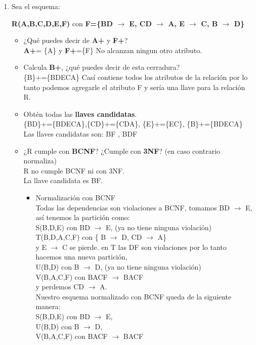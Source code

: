 \documentclass{article}
\begin{document}
\begin{enumerate}
    	\item Sea el esquema:\\
    	\begin{center}
    		\textbf{R(A,B,C,D,E,F)} con \textbf{F=\{BD $\rightarrow$ E, CD $\rightarrow$ A, E $\rightarrow$ C, B $\rightarrow$ D\}}
    	\end{center} 
    	\begin{itemize}
    		\item ¿Qué puedes decir de \textbf{{A}+} y \textbf{{F}+}?\\
    		\textbf{{A}+}= \{A\} y \textbf{{F}+}=\{F\} No alcanzan ningun otro atributo.
    		\item Calcula \textbf{{B}+}, ¿qué puedes decir de esta cerradura?\\
    		\{B\}+=\{BDECA\} Casí contiene todos los atributos de la relación por lo tanto podemos agregarle el atributo F y sería una llave para la relación R.
    		\item  Obtén todas las \textbf{llaves candidatas}.\\
    		\{BD\}+=\{BDECA\},\{CD\}+=\{CDA\}, \{E\}+=\{EC\}, \{B\}+=\{BDECA\}\\
    		Las llaves candidatas son: BF , BDF
    		\item  ¿R cumple con \textbf{BCNF}? ¿Cumple con \textbf{3NF}? (en caso contrario normaliza) \\
    		R no cumple BCNF ni con 3NF.\\
    		La llave candidata es BF.
    		\begin{itemize}
    			\item Normalización con BCNF\\
    			Todas las dependencias son violaciones a BCNF, tomamos BD $\rightarrow$ E, así tenemos la partición como:\\
    			S(B,D,E) con BD $\rightarrow$ E, (ya no tiene ninguna violación)\\
    			T(B,D,A,C,F) con \{ B $\rightarrow$ D, CD $\rightarrow$ A\}\\
    			y E $\rightarrow$ C se pierde.
    			en T las DF son violaciones por lo tanto hacemos una nueva partición,\\
    			U(B,D) con B $\rightarrow$ D, (ya no tiene ninguna violación) \\
    			V(B,A,C,F) con BACF $\rightarrow$ BACF\\
    			y perdemos CD $\rightarrow$ A.\\
    			
    			Nuestro esquema normalizado con BCNF queda de la siguiente manera:\\
    			S(B,D,E) con BD $\rightarrow$ E,\\
    			U(B,D) con B $\rightarrow$ D,  \\
    			V(B,A,C,F) con BACF $\rightarrow$ BACF
    			

\end{itemize}
\end{itemize}
\end{enumerate}
\end{document}
